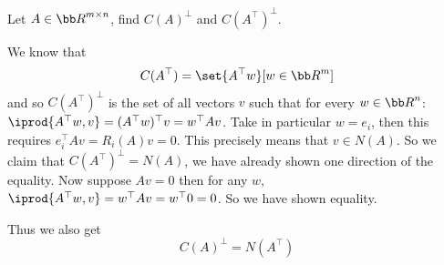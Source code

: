 \bexerc

    Let $A\in{\bb R}^{m\times n}$, find $C(A)^\perp$ and $C(A^\top)^\perp$.

\eexerc

We know that
$$ C(A^\top) = \set{A^\top w}[w\in{\bb R}^m] $$
and so $C(A^\top )^\perp$ is the set of all vectors $v$ such that for every $w\in{\bb R}^n$: $\iprod{A^\top w,v}=(A^\top w)^\top v=w^\top Av$.
Take in particular $w=e_i$, then this requires $e_i^\top Av=R_i(A)v=0$.
This precisely means that $v\in N(A)$.
So we claim that $C(A^\top)^\perp=N(A)$, we have already shown one direction of the equality.
Now suppose $Av=0$ then for any $w$, $\iprod{A^\top w,v}=w^\top Av=w^\top0=0$.
So we have shown equality.

Thus we also get
$$ C(A)^\perp = N(A^\top) $$

\bye

